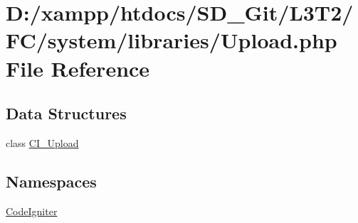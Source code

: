 \hypertarget{_upload_8php}{}\section{D\+:/xampp/htdocs/\+S\+D\+\_\+\+Git/\+L3\+T2/\+F\+C/system/libraries/\+Upload.php File Reference}
\label{_upload_8php}
\subsection*{Data Structures}
\begin{DoxyCompactItemize}
\item 
class \hyperlink{class_c_i___upload}{C\+I\+\_\+\+Upload}
\end{DoxyCompactItemize}
\subsection*{Namespaces}
\begin{DoxyCompactItemize}
\item 
 \hyperlink{namespace_code_igniter}{Code\+Igniter}
\end{DoxyCompactItemize}
